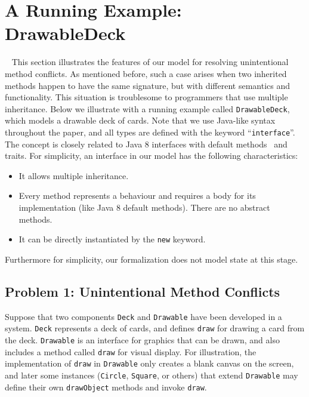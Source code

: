 \section{A Running Example: DrawableDeck}~\label{sec:overview}
This section illustrates the features of our \MIM{} model for
resolving unintentional method conflicts. As mentioned before, such a
case arises when two inherited methods happen to have the same
signature, but with different semantics and functionality. This
situation is troublesome to programmers that use multiple
inheritance. Below we illustrate with a running example called
\lstinline|DrawableDeck|, which models a drawable deck of cards. 
Note that we use Java-like syntax
throughout the paper, and all types are defined with the keyword
``\lstinline|interface|''. The concept is closely related to Java 8
interfaces with default methods~\cite{bono14} and traits. For simplicity, an interface in our model has
the following characteristics:
\begin{itemize}
  \item It allows multiple inheritance.
  \item Every method represents a behaviour and requires a body for its implementation (like Java 8 default methods). There are no abstract methods.
  \item It can be directly instantiated by the \lstinline|new| keyword.
\end{itemize}
Furthermore for simplicity, our formalization does not model state at
this stage. %

\subsection{Problem 1: Unintentional Method Conflicts}
Suppose that two components \lstinline|Deck| and \lstinline|Drawable| 
have been developed in a system.  \lstinline|Deck| represents a deck
of cards, and defines \lstinline|draw| for drawing a card from the
deck.  \lstinline|Drawable| is an interface for graphics that
can be drawn, and also includes a method called \lstinline|draw| for
visual display. For illustration, the implementation of
\lstinline|draw| in \lstinline|Drawable| only creates a blank canvas
on the screen, and later some instances (\lstinline|Circle|,
\lstinline|Square|, or others) that extend \lstinline|Drawable| may
define their own \lstinline|drawObject| methods and invoke
\lstinline|draw|.

